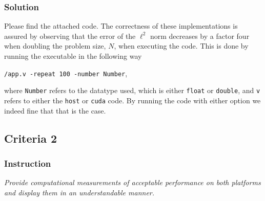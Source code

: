 \documentclass[10pt]{article}
\begin{document}
\subsubsection{Solution}
Please find the attached code. The correctness of these implementations is assured by observing that the error of the $\ell^2$ norm decreases by a factor four when doubling the problem size, $N$, when executing the code. This is done by running the executable in the following way
\begin{center}
    \texttt{/app.v -repeat 100 -number Number},
\end{center}
where \texttt{Number} refers to the datatype used, which is either \texttt{float} or \texttt{double}, and \texttt{v} refers to either the \texttt{host} or \texttt{cuda} code. By running the code with either option we indeed fine that that is the case.
\subsection{Criteria 2}
\subsubsection{Instruction}
\textit{Provide computational measurements of acceptable performance on both platforms and display them in an understandable manner.}
\end{document}
